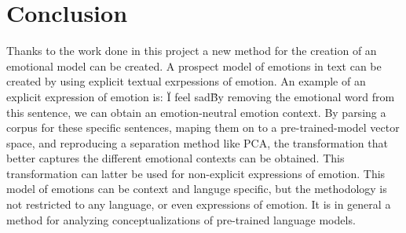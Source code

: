 \chapter{Conclusion}\label{chap:Conclusion}




Thanks to the work done in this project a new method for the creation of an emotional model can be created. A prospect model of emotions in text can be created by using explicit textual exrpessions of emotion. An example of an explicit expression of emotion is: \"I feel sad\" By removing the emotional word from this sentence, we can obtain an emotion-neutral emotion context. By parsing a corpus for these specific sentences, maping them on to a pre-trained-model vector space, and reproducing a separation method like PCA, the transformation that better captures the different emotional contexts can be obtained. This transformation can latter be used for non-explicit expressions of emotion.
This model of emotions can be context and languge specific, but the methodology is not restricted to any language, or even expressions of emotion. It is in general a method for analyzing conceptualizations of pre-trained language models.




